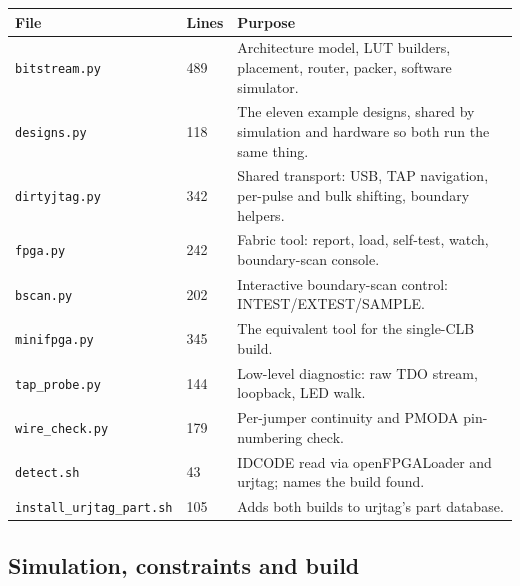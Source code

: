 \documentclass[11pt,a4paper]{article}
\newcommand{\file}[1]{\texttt{#1}}
\begin{document}
\begin{longtable}{llp{72mm}}
\toprule
\textbf{File} & \textbf{Lines} & \textbf{Purpose} \\
\midrule
\endhead
\file{bitstream.py}     & 489 & Architecture model, LUT builders, placement, router, packer, software simulator. \\
\file{designs.py}       & 118 & The eleven example designs, shared by simulation and hardware so both run the same thing. \\
\file{dirtyjtag.py}     & 342 & Shared transport: USB, TAP navigation, per-pulse and bulk shifting, boundary helpers. \\
\file{fpga.py}          & 242 & Fabric tool: report, load, self-test, watch, boundary-scan console. \\
\file{bscan.py}         & 202 & Interactive boundary-scan control: INTEST/EXTEST/SAMPLE. \\
\file{minifpga.py}      & 345 & The equivalent tool for the single-CLB build. \\
\file{tap\_probe.py}    & 144 & Low-level diagnostic: raw TDO stream, loopback, LED walk. \\
\file{wire\_check.py}   & 179 & Per-jumper continuity and PMODA pin-numbering check. \\
\file{detect.sh}        & 43  & IDCODE read via openFPGALoader and urjtag; names the build found. \\
\file{install\_urjtag\_part.sh} & 105 & Adds both builds to urjtag's part database. \\
\bottomrule
\end{longtable}

\subsection{Simulation, constraints and build}
\end{document}
